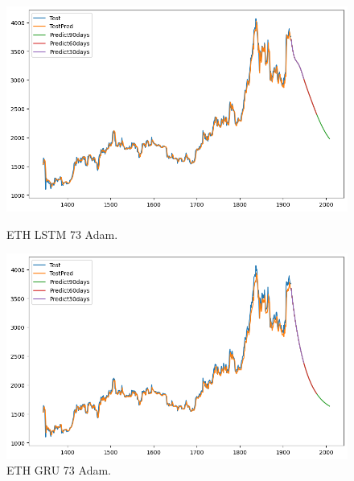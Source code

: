 \documentclass{ieeeojies}
\begin{document}
\begin{figure}[H]
  \centering
  \begin{minipage}{0.48\linewidth}
    \centering
    \includegraphics[width=1\linewidth]{image/ETH_LSTM_73_Adam.png}
    \caption{ETH LSTM 73 Adam.}
  \end{minipage}
\hfill
  \begin{minipage}{0.48\linewidth}
    \centering
    \includegraphics[width=1\linewidth]{image/ETH_GRU_73_Adam.png}
    \caption{ETH GRU 73 Adam.}
  \end{minipage}
\end{figure}
\end{document}
